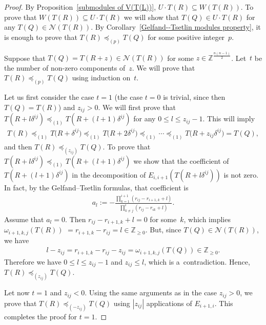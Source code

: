 \begin{proof}
By Proposition~\ref{submodules of V(T(L))}, $U\cdot T(R)\subseteq W(T(R))$.
To prove that $ W(T(R))\subseteq U\cdot T(R)$ we will show that $T(Q)\in U\cdot T(R)$ for any
$T(Q)\in\mathcal{N}(T(R))$.
By Corollary~\ref{Gelfand--Tsetlin modules property}, it is enough to prove that $T(R)\preceq_{(p)} T(Q)$ for some
positive integer~$p$.

Suppose that $T(Q)=T(R+z)\in \mathcal{N}(T(R))$ for some $z\in\mathbb{\mathbb{Z}}^{\frac{n(n-1)}{2}}$.
Let~$t$ be the number of non-zero components of~$z$.
We will prove that $T(R)\preceq_{(p)} T(Q)$ using induction on~$t$.

Let us f\/irst consider the case $t=1$ (the case $t=0$ is trivial, since then $T(Q)=T(R)$) and $z_{ij}>0$.
We will f\/irst prove that $T(R+l\delta^{ij})\preceq_{(1)}T(R+(l+1)\delta^{ij})$ for any $0\leq l \leq z_{ij}-1$.
This will imply
\begin{gather*}
T(R)\preceq_{(1)}T\big(R+\delta^{ij}\big)\preceq_{(1)}T\big(R+2\delta^{ij}\big)\preceq_{(1)}\cdots\preceq_{(1)}T\big(R+z_{ij}\delta^{ij}\big)=T(Q),
\end{gather*}
and then $T(R)\preceq_{(z_{ij})}T(Q)$.
To prove that $T(R+l\delta^{ij})\preceq_{(1)}T(R+(l+1)\delta^{ij})$ we show that the coef\/f\/icient of
$T(R+(l+1)\delta^{ij})$ in the decomposition of $E_{i,i+1}(T(R+l\delta^{ij}))$ is not zero.
In fact, by the Gelfand--Tsetlin formulas, that coef\/f\/icient is
\begin{gather*}
a_{l}:=-\frac{\prod\limits_{k=1}^{i+1}(r_{ij}-r_{i+1,k}+l)}{\prod\limits_{k\neq j}^{i}(r_{ij}-r_{ik}+l)}.
\end{gather*}
Assume that $a_{l}=0$.
Then $r_{ij}-r_{i+1,k}+l=0$ for some~$k$, which implies $\omega_{i+1,k,j}(T(R))$ $=r_{i+1,k}-r_{ij}=l\in\mathbb{Z}_{\geq
0}$.
But, since $T(Q)\in\mathcal{N}(T(R))$, we have{\samepage
\begin{gather*}
l-z_{ij}=r_{i+1,k}-r_{ij}-z_{ij}=\omega_{i+1,k,j}(T(Q))\in\mathbb{Z}_{\geq{0}}.
\end{gather*}
Therefore we have %
$ 0\leq l \leq z_{ij}-1$ and $z_{ij}\leq l$, which is a~contradiction.
Hence,
$T(R)\preceq_{(z_{ij})}T(Q)$.}

Let now $t=1$ and $z_{ij}<0$.
Using the same arguments as in the case $z_{ij}>0$, we prove that $T(R)\preceq_{(-z_{ij})}T(Q)$ using $|z_{ij}|$
applications of $E_{i+1,i}$.
This completes the proof for $t=1$.


\end{proof}
